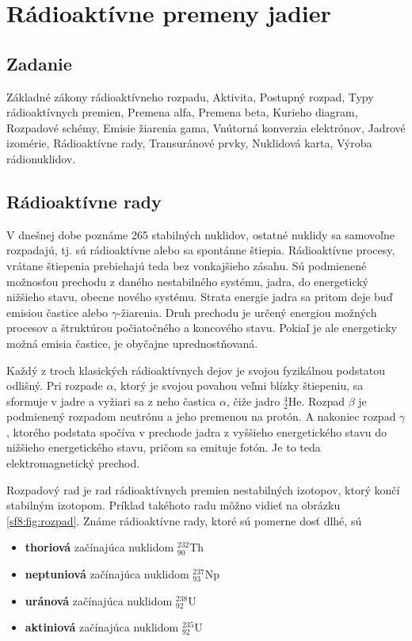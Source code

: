 \documentclass[../../main.tex]{subfiles}
\begin{document}
\chapter{Rádioaktívne premeny jadier}

\section{Zadanie}

Základné zákony rádioaktívneho rozpadu, Aktivita, Postupný rozpad, Typy rádioaktívnych premien, Premena alfa, Premena beta, Kurieho diagram, Rozpadové schémy, Emisie žiarenia gama, Vnútorná konverzia elektrónov, Jadrové izomérie, Rádioaktívne rady, Transuránové prvky, Nuklidová karta, Výroba rádionuklidov.


\section{Rádioaktívne rady}
V dnešnej dobe poznáme 265 stabilných nuklidov, ostatné nuklidy sa samovoľne rozpadajú, tj. sú rádioaktívne alebo sa spontánne štiepia. Rádioaktívne procesy, vrátane štiepenia prebiehajú teda bez vonkajšieho zásahu. Sú podmienené možnosťou prechodu z daného nestabilného systému, jadra, do energetický nižšieho stavu, obecne nového systému. Strata energie jadra sa pritom deje buď emisiou častice alebo $\gamma$-žiarenia. Druh prechodu je určený energiou možných procesov a štruktúrou počiatočného a koncového stavu. Pokiaľ je ale energeticky možná emisia častice, je obyčajne uprednostňovaná.

Každý z troch klasických rádioaktívnych dejov je svojou fyzikálnou podstatou odlišný. Pri rozpade $\alpha$, ktorý je svojou povahou veľmi blízky štiepeniu, sa sformuje v jadre a vyžiari sa z neho častica $\alpha$, čiže jadro $_{2}^{4}$He. Rozpad $\beta$ je podmienený rozpadom neutrónu a jeho premenou na protón. A nakoniec rozpad $\gamma$, ktorého podstata spočíva v prechode jadra z vyššieho energetického stavu do nižšieho energetického stavu, pričom sa emituje fotón. Je to teda elektromagnetický prechod.  

Rozpadový rad je rad rádioaktívnych premien nestabilných izotopov, ktorý končí  stabilným izotopom. Príklad takéhoto radu môžno vidieť na obrázku \ref{sf8:fig:rozpad}. Známe rádioaktívne rady, ktoré sú pomerne dosť dlhé, sú
\begin{itemize}
\item \textbf{thoriová} začínajúca nuklidom $_{90}^{232}$Th
\item \textbf{neptuniová} začínajúca nuklidom $_{93}^{237}$Np
\item \textbf{uránová} začínajúca nuklidom $_{92}^{238}$U
\item \textbf{aktiniová} začínajúca nuklidom $_{92}^{235}$U
\end{itemize}
\end{document}

